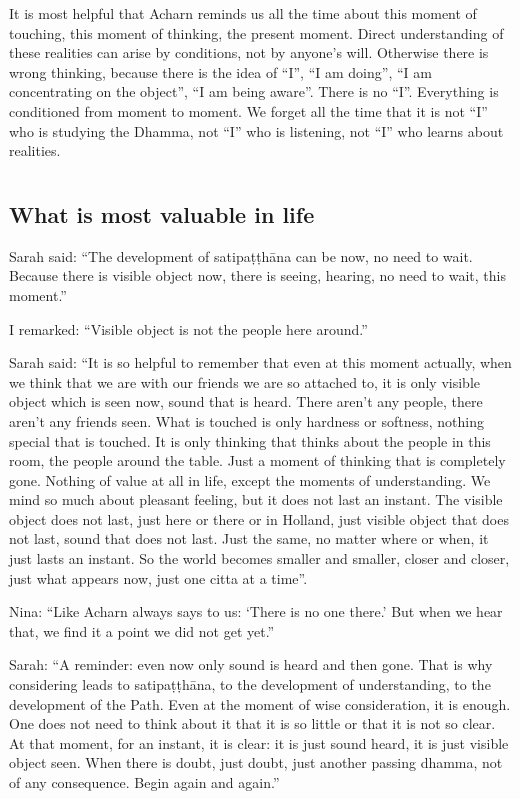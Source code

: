 It is most helpful that Acharn reminds us all the time about this moment
of touching, this moment of thinking, the present moment. Direct
understanding of these realities can arise by conditions, not by
anyone's will. Otherwise there is wrong thinking, because there is the
idea of ``I'', ``I am doing'', ``I am concentrating on the object'', ``I
am being aware''. There is no ``I''. Everything is conditioned from
moment to moment. We forget all the time that it is not ``I'' who is
studying the Dhamma, not ``I'' who is listening, not ``I'' who learns
about realities.


\chapter[What is most valuable in life]{}
\section*{What is most valuable in life}

Sarah said: ``The development of satipaṭṭhāna can be now, no need to
wait. Because there is visible object now, there is seeing, hearing, no
need to wait, this moment.''

I remarked: ``Visible object is not the people here around.''

Sarah said: ``It is so helpful to remember that even at this moment
actually, when we think that we are with our friends we are so attached
to, it is only visible object which is seen now, sound that is heard.
There aren't any people, there aren't any friends seen. What is touched
is only hardness or softness, nothing special that is touched. It is
only thinking that thinks about the people in this room, the people
around the table. Just a moment of thinking that is completely gone.
Nothing of value at all in life, except the moments of understanding. We
mind so much about pleasant feeling, but it does not last an instant.
The visible object does not last, just here or there or in Holland, just
visible object that does not last, sound that does not last. Just the
same, no matter where or when, it just lasts an instant. So the world
becomes smaller and smaller, closer and closer, just what appears now,
just one citta at a time''.

Nina: ``Like Acharn always says to us: `There is no one there.' But when
we hear that, we find it a point we did not get yet.''

Sarah: ``A reminder: even now only sound is heard and then gone. That is
why considering leads to satipaṭṭhāna, to the development of
understanding, to the development of the Path. Even at the moment of
wise consideration, it is enough. One does not need to think about it
that it is so little or that it is not so clear. At that moment, for an
instant, it is clear: it is just sound heard, it is just visible object
seen. When there is doubt, just doubt, just another passing dhamma, not
of any consequence. Begin again and again.''

